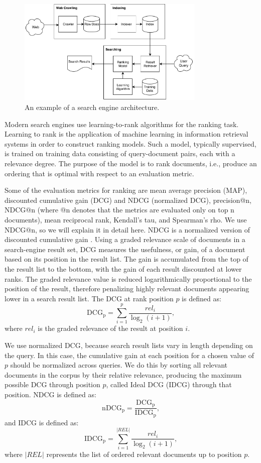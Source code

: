 \begin{figure}
  \centering
  \includegraphics[width=0.8\textwidth]{img/searchengine.pdf}
  \caption{An example of a search engine architecture.}
  \label{fig:searchengine}
\end{figure}

Modern search engines use learning-to-rank algorithms for the ranking task. Learning to rank is the application of machine learning in information retrieval systems in order to construct ranking models. Such a model, typically supervised, is trained on training data consisting of query-document pairs, each with a relevance degree. The purpose of the model is to rank documents, i.e., produce an ordering that is optimal with respect to an evaluation metric.

Some of the evaluation metrics for ranking are mean average precision (MAP), discounted cumulative gain (DCG) and NDCG (normalized DCG), precision@n, NDCG@n (where @n denotes that the metrics are evaluated only on top n documents), mean reciprocal rank, Kendall's tau, and Spearman's rho. We use NDCG@n, so we will explain it in detail here. NDCG is a normalized version of discounted cumulative gain \citep{jarvelin2002cumulated}. Using a graded relevance scale of documents in a search-engine result set, DCG measures the usefulness, or gain, of a document based on its position in the result list. The gain is accumulated from the top of the result list to the bottom, with the gain of each result discounted at lower ranks. The graded relevance value is reduced logarithmically proportional to the position of the result, therefore penalizing highly relevant documents appearing lower in a search result list. The DCG at rank position $p$ is defined as:
\[ \mathrm {DCG_{p}} =\sum _{i=1}^{p}{\frac {rel_{i}}{\log _{2}(i+1)}}, \]
where $rel_{i}$ is the graded relevance of the result at position $i$.

We use normalized DCG, because search result lists vary in length depending on the query. In this case, the cumulative gain at each position for a chosen value of $p$ should be normalized across queries. We do this by sorting all relevant documents in the corpus by their relative relevance, producing the maximum possible DCG through position $p$, called Ideal DCG (IDCG) through that position. NDCG is defined as:
\[ \mathrm {nDCG_{p}} = \frac {\mathrm {DCG_{p}}}{\mathrm {IDCG_{p}}}, \]
and IDCG is defined as:
\[ \mathrm {IDCG_{p}} =\sum _{i=1}^{|REL|}{\frac {rel_{i}}{\log _{2}(i+1)}}, \]
where $|REL|$ represents the list of ordered relevant documents up to position $p$.

